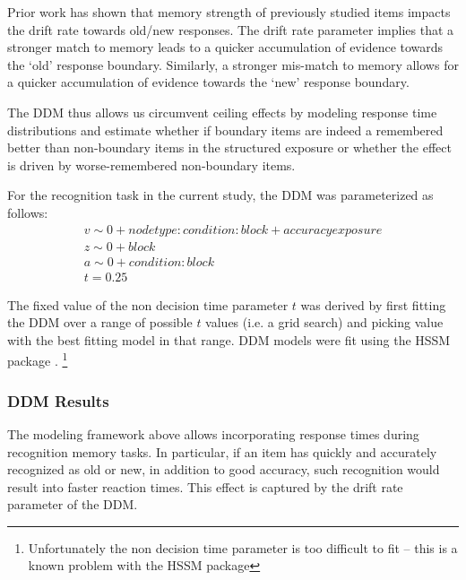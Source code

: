 Prior work has shown that memory strength of previously studied items impacts the drift rate towards old/new responses. The drift rate parameter implies that a stronger match to memory leads to a quicker accumulation of evidence towards the `old' response boundary. Similarly, a stronger mis-match to memory allows for a quicker accumulation of evidence towards the `new' response boundary\cite{ratcliff2004diffusion,ratcliff2022discriminating}. 

The DDM thus allows us circumvent ceiling effects by modeling response time distributions and estimate whether if boundary items are indeed a remembered better than non-boundary items in the structured exposure or whether the effect is driven by worse-remembered non-boundary items. 

For the recognition task in the current study, the DDM was parameterized as follows: 
\begin{equation}
    \begin{aligned}
        v \sim 0 + node type:condition:block + accuracy exposure \\
        z \sim 0 + block \\
        a \sim 0 + condition:block \\
        t = 0.25
    \end{aligned}
\end{equation}

The fixed value of the non decision time parameter $t$ was derived by first fitting the DDM over a range of possible $t$ values (i.e. a grid search) and picking value with the best fitting model in that range. DDM models were fit using the HSSM package \cite{fengler2022beyond}. \footnote{Unfortunately the non decision time parameter is too difficult to fit -- this is a known problem with the HSSM package} 

\subsubsection*{DDM Results}
The modeling framework above allows incorporating response times during recognition memory tasks. In particular, if an item has quickly and accurately recognized as old or new, in addition to good accuracy, such recognition would result into faster reaction times. This effect is captured by the drift rate parameter of the DDM. 

